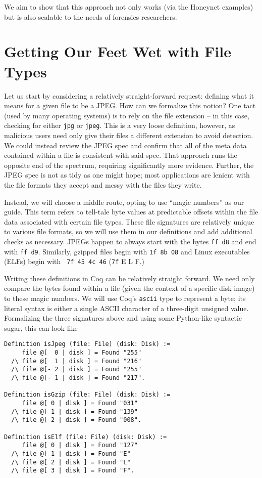 \documentclass[nocopyrightspace]{sigplanconf}
\begin{document}
We aim to show that this approach not only works (via the Honeynet examples)
but is also scalable to the needs of forensics researchers.

\section{Getting Our Feet Wet with File Types}

Let us start by considering a relatively straight-forward request: defining
what it means for a given file to be a JPEG. How can we formalize this notion?
One tact (used by many operating systems) is to rely on the file extension --
in this case, checking for either {\tt jpg} or {\tt jpeg}. This is a very
loose definition, however, as malicious users need only give their files a
different extension to avoid detection. We could instead review the JPEG spec
and confirm that all of the meta data contained within a file is consistent
with said spec. That approach runs the opposite end of the spectrum, requiring
significantly more evidence. Further, the JPEG spec is not as tidy as one
might hope; most applications are lenient with the file formats they accept
and messy with the files they write.

Instead, we will choose a middle route, opting to use ``magic numbers'' as our
guide. This term refers to tell-tale byte values at predictable offsets within
the file data associated with certain file types. These file signatures are
relatively unique to various file formats, so we will use them in our
definitions and add additional checks as necessary. JPEGs happen to always
start with the bytes {\tt ff d8} and end with {\tt ff d9}. Similarly, gzipped
files begin with {\tt 1f 8b 08} and Linux executables (ELFs) begin with {\tt
7f 45 4c 46} ({\tt 7f} E L F.)

Writing these definitions in Coq can be relatively straight forward. We need
only compare the bytes found within a file (given the context of a specific
disk image) to these magic numbers. We will use Coq's {\tt ascii} type to
represent a byte; its literal syntax is either a single ASCII character of a
three-digit unsigned value. Formalizing the three signatures above and using
some Python-like syntactic sugar, this can look like

\begin{lstlisting}
Definition isJpeg (file: File) (disk: Disk) :=
     file @[  0 | disk ] = Found "255"
  /\ file @[  1 | disk ] = Found "216"
  /\ file @[- 2 | disk ] = Found "255"
  /\ file @[- 1 | disk ] = Found "217".

Definition isGzip (file: File) (disk: Disk) :=
     file @[ 0 | disk ] = Found "031"
  /\ file @[ 1 | disk ] = Found "139" 
  /\ file @[ 2 | disk ] = Found "008".

Definition isElf (file: File) (disk: Disk) :=
     file @[ 0 | disk ] = Found "127"
  /\ file @[ 1 | disk ] = Found "E"
  /\ file @[ 2 | disk ] = Found "L"
  /\ file @[ 3 | disk ] = Found "F".
\end{lstlisting}
\end{document}
